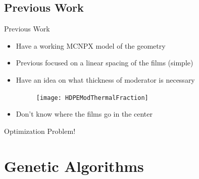 \documentclass[compress]{beamer}
\begin{document}
\subsection{Previous Work}
\begin{frame}{Previous Work}
\begin{itemize}
	\small
	\item Have a working MCNPX model of the geometry
	\item Previous focused on a linear spacing of the films (simple)
	\item Have an idea on what thickness of moderator is necessary
		\begin{figure}
			\centering
			\texttt{[image: HDPEModThermalFraction]}
		\end{figure}
	\item Don't know where the films go in the center
\end{itemize}
\centering
Optimization Problem!
\end{frame}
\section{Genetic Algorithms}
\end{document}

